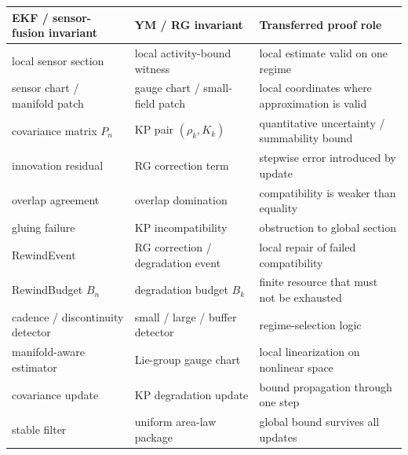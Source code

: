 %
%
%
%

\begin{tabular}{@{}p{4.4cm}p{4.4cm}p{5.4cm}@{}}
  \toprule
  \textbf{EKF / sensor-fusion invariant} & \textbf{YM / RG invariant} & \textbf{Transferred proof role} \\
  \midrule
  local sensor section &
    local activity-bound witness &
    local estimate valid on one regime \\
  \addlinespace[2pt]
  sensor chart / manifold patch &
    gauge chart / small-field patch &
    local coordinates where approximation is valid \\
  \addlinespace[2pt]
  covariance matrix $P_n$ &
    KP pair $(\rho_k, K_k)$ &
    quantitative uncertainty / summability bound \\
  \addlinespace[2pt]
  innovation residual &
    RG correction term &
    stepwise error introduced by update \\
  \addlinespace[2pt]
  overlap agreement &
    overlap domination &
    compatibility is weaker than equality \\
  \addlinespace[2pt]
  gluing failure &
    KP incompatibility &
    obstruction to global section \\
  \addlinespace[2pt]
  RewindEvent &
    RG correction / degradation event &
    local repair of failed compatibility \\
  \addlinespace[2pt]
  RewindBudget $B_n$ &
    degradation budget $B_k$ &
    finite resource that must not be exhausted \\
  \addlinespace[2pt]
  cadence / discontinuity detector &
    small / large / buffer detector &
    regime-selection logic \\
  \addlinespace[2pt]
  manifold-aware estimator &
    Lie-group gauge chart &
    local linearization on nonlinear space \\
  \addlinespace[2pt]
  covariance update &
    KP degradation update &
    bound propagation through one step \\
  \addlinespace[2pt]
  stable filter &
    uniform area-law package &
    global bound survives all updates \\
  \bottomrule
\end{tabular}

